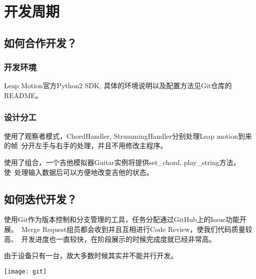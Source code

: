 \chapter{开发周期}


    \section{如何合作开发？}

        \subsection{开发环境}
        Leap Motion官方Python2 SDK, 具体的环境说明以及配置方法见Git仓库的README。

        \subsection{设计分工}
        使用了观察者模式，ChordHandler, StrummingHandler分别处理Leap motion到来的帧\
        分开左手与右手的处理，并且不用修改主程序。

        使用了组合，一个吉他模拟器Guitar实例将提供set\_chord, play\_string方法，使\
        处理输入数据后可以方便地改变吉他的状态。

    \section{如何迭代开发？}

        使用Git作为版本控制和分支管理的工具，任务分配通过GitHub上的Issue功能开展。\
        Merge Request组员都会收到并且互相进行Code Review，使我们代码质量较高、\
        开发进度也一直较快，在阶段展示的时候完成度就已经非常高。

        由于设备只有一台，故大多数时候其实并不能并行开发。
        
        \texttt{[image: git]}
